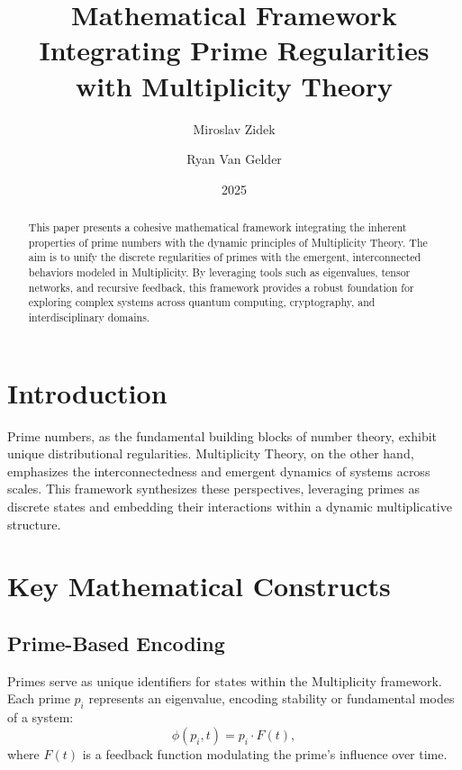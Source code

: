 \documentclass{article}
\title{Mathematical Framework Integrating Prime Regularities with Multiplicity Theory}
\author[1]{Miroslav Zidek}
\author[2]{Ryan Van Gelder}
\affil{Citizen Gardens - The Foundation of Multiplicity\\info@citizengardens.org}
\date{2025}
\theoremstyle{plain}
\begin{document}
\maketitle

\begin{abstract}
This paper presents a cohesive mathematical framework integrating the inherent properties of prime numbers with the dynamic principles of Multiplicity Theory. The aim is to unify the discrete regularities of primes with the emergent, interconnected behaviors modeled in Multiplicity. By leveraging tools such as eigenvalues, tensor networks, and recursive feedback, this framework provides a robust foundation for exploring complex systems across quantum computing, cryptography, and interdisciplinary domains.
\end{abstract}
\section{Introduction}
Prime numbers, as the fundamental building blocks of number theory, exhibit unique distributional regularities. Multiplicity Theory, on the other hand, emphasizes the interconnectedness and emergent dynamics of systems across scales. This framework synthesizes these perspectives, leveraging primes as discrete states and embedding their interactions within a dynamic multiplicative structure.

\section{Key Mathematical Constructs}

\subsection{Prime-Based Encoding}
Primes serve as unique identifiers for states within the Multiplicity framework. Each prime $p_i$ represents an eigenvalue, encoding stability or fundamental modes of a system:
\begin{equation}
\phi(p_i, t) = p_i \cdot F(t),
\end{equation}
where $F(t)$ is a feedback function modulating the prime's influence over time.
\end{document}
